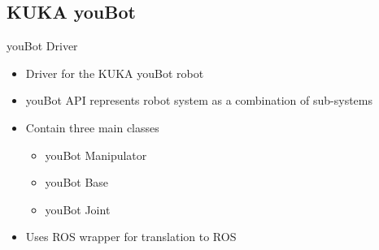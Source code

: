 \subsection{KUKA youBot}
\begin{frame}{youBot Driver}
\begin{itemize}
	\item Driver for the KUKA youBot robot
	\item youBot API represents robot system as a combination of sub-systems
	\item Contain three main classes
		\begin{itemize}
			\item youBot Manipulator
			\item youBot Base
			\item youBot Joint 
		\end{itemize} 
		
	\item Uses ROS wrapper for translation to ROS
\end{itemize}

  
\end{frame}

